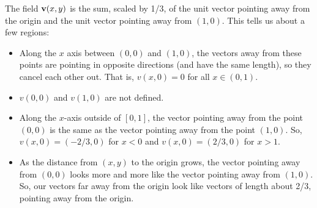 \begin{solution}

The field $\mathbf{v}(x,y)$ is the sum, scaled by 1/3, of the unit vector pointing away from the origin and the unit vector pointing away from $(1,0)$. This tells us about a few regions:
\begin{itemize}
\item Along the $x$ axis between $(0,0)$ and $(1,0)$, the vectors away from these points are pointing in opposite directions (and have the same length), so they cancel each other out. That is, $v(x,0)=0$ for all $x \in (0,1)$. 
\item $v(0,0)$ and $v(1,0)$ are not defined.
\item Along the $x$-axis outside of $[0,1]$, the vector pointing away from the point $(0,0)$ is the same as the  vector pointing away from the point $(1,0)$. So, $v(x,0)=(-2/3,0)$ for $x<0$ and $v(x,0)=(2/3,0)$ for $x>1$.
\begin{center}
\end{center}
\item As the distance from $(x,y)$ to the origin grows, the vector pointing away from $(0,0)$ looks more and more like the vector pointing away from $(1,0)$. So, our vectors far away from the origin look like vectors of length about 2/3, pointing away from the origin.


\begin{center}
\end{center}
\end{itemize}
\end{solution}


